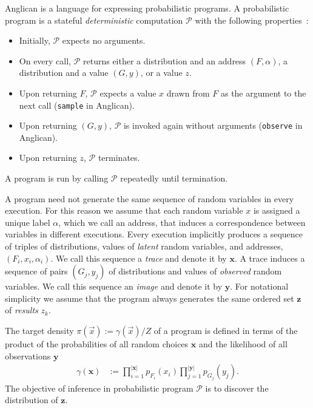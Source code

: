 \documentclass[preprint]{sigplanconf}
\begin{document}
Anglican is a language for expressing probabilistic programs.
A probabilistic program is a stateful \textit{deterministic} computation
$\mathcal{P}$ with the following properties~\cite{TMP+15}:
\begin{itemize}
\item Initially, $\mathcal{P}$ expects no arguments.
\item On every call, $\mathcal{P}$ returns either a distribution
  and an address $(F,\alpha)$, a distribution and a value $(G,
        y)$, or a value $z$.
\item Upon returning $F$, $\mathcal{P}$ expects a value $x$ drawn from $F$ as
    the argument to the next call (\texttt{sample} in Anglican).
\item Upon returning $(G, y)$, $\mathcal{P}$ is invoked again
    without arguments (\texttt{observe} in Anglican).
\item Upon returning $z$, $\mathcal{P}$ terminates.
\end{itemize}
A program is run by calling $\mathcal{P}$ repeatedly until
termination.

A program need not generate the same sequence of random variables in every
execution. For this reason we assume that each random variable $x$ is assigned
a unique label $\alpha$, which we call an address, that induces a
correspondence between variables in different executions. Every execution
implicitly produces a sequence of triples of distributions, values of
\textit{latent} random variables, and addresses, $(F_i, x_i, \alpha_i)$.  We
call this sequence a \textit{trace} and denote it by $\pmb{x}$. A trace induces
a sequence of pairs $(G_j, y_j)$ of distributions and values of
\textit{observed} random variables. We call this sequence an \textit{image} and
denote it by $\pmb{y}$. For notational simplicity we assume that the program
always generates the same ordered set $\pmb{z}$ of \textit{results} $z_k$.

The target density $\pi(\vec{x}) := \gamma(\vec{x}) / Z$ of a program
is defined in terms of the product of the probabilities of all random
choices $\pmb{x}$ and the likelihood of all observations $\pmb{y}$
\begin{align}
  \gamma(\pmb{x}) 
  &:= 
  \prod_{i=1}^{\left|\pmb{x}\right|}
  p_{F_i}(x_i) \prod_{j=1}^{\left|\pmb{y}\right|}p_{G_j}(y_{j}).
  \label{eqn:p-trace}
\end{align}
The objective of inference in probabilistic program $\mathcal{P}$
is to discover the distribution of $\pmb{z}$.
\end{document}
